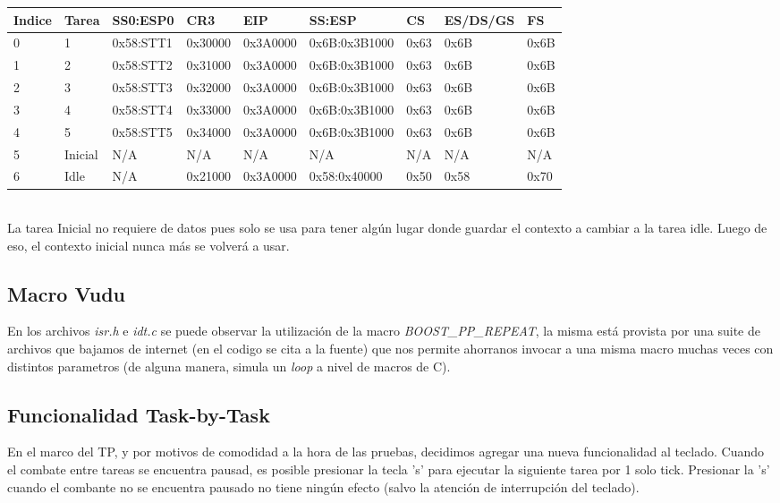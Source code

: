 \begin{tabular}{|l|l|l|l|l|l|l|l|l|}
	\hline
	Indice & Tarea  & SS0:ESP0 & CR3     & EIP      & SS:ESP        & CS   & ES/DS/GS & FS \\ \hline
	0      & 1      & 0x58:STT1& 0x30000 & 0x3A0000 & 0x6B:0x3B1000 & 0x63 & 0x6B     & 0x6B\\ \hline
	1      & 2      & 0x58:STT2& 0x31000 & 0x3A0000 & 0x6B:0x3B1000 & 0x63 & 0x6B     & 0x6B\\ \hline
	2      & 3      & 0x58:STT3& 0x32000 & 0x3A0000 & 0x6B:0x3B1000 & 0x63 & 0x6B     & 0x6B\\ \hline
	3      & 4      & 0x58:STT4& 0x33000 & 0x3A0000 & 0x6B:0x3B1000 & 0x63 & 0x6B     & 0x6B\\ \hline
	4      & 5      & 0x58:STT5& 0x34000 & 0x3A0000 & 0x6B:0x3B1000 & 0x63 & 0x6B     & 0x6B\\ \hline
	5      & Inicial& N/A      & N/A     & N/A      & N/A           & N/A  & N/A      & N/A\\ \hline
	6      & Idle   & N/A      & 0x21000 & 0x3A0000 & 0x58:0x40000  & 0x50 & 0x58     & 0x70\\ \hline
\end{tabular}
\\
La tarea Inicial no requiere de datos pues solo se usa para tener algún lugar donde guardar el contexto a cambiar a la tarea idle. Luego de eso, el contexto inicial nunca más se volverá a usar.\\

\subsection{Macro Vudu}
En los archivos \textit{isr.h} e \textit{idt.c} se puede observar la utilización de la macro \textit{BOOST\_PP\_REPEAT}, la misma está provista por una suite de archivos que bajamos de internet (en el codigo se cita a la fuente) que nos permite ahorranos invocar a una misma macro muchas veces con distintos parametros (de alguna manera, simula un \textit{loop} a nivel de macros de C).

\subsection{Funcionalidad Task-by-Task}
En el marco del TP, y por motivos de comodidad a la hora de las pruebas, decidimos agregar una nueva funcionalidad al teclado. Cuando el combate entre tareas se encuentra pausad, es posible presionar la tecla 's' para ejecutar la siguiente tarea por 1 solo tick. Presionar la 's' cuando el combante no se encuentra pausado no tiene ningún efecto (salvo la atención de interrupción del teclado).